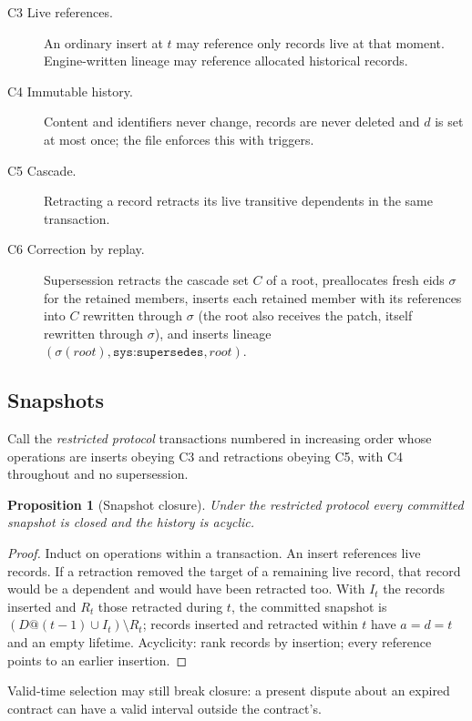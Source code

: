 \documentclass[11pt]{article}
\theoremstyle{plain}
\newtheorem{proposition}[theorem]{Proposition}
\theoremstyle{definition}
\theoremstyle{remark}
\newcommand{\sys}[1]{\texttt{sys:#1}}
\begin{document}
\begin{description}
\item[C3 Live references.] An ordinary insert at $t$ may reference only records live
at that moment. Engine-written lineage may reference allocated historical records.
\item[C4 Immutable history.] Content and identifiers never change, records are never
deleted and $d$ is set at most once; the file enforces this with triggers.
\item[C5 Cascade.] Retracting a record retracts its live transitive dependents in
the same transaction.
\item[C6 Correction by replay.] Supersession retracts the cascade set $C$ of a root,
preallocates fresh eids $\sigma$ for the retained members, inserts each retained
member with its references into $C$ rewritten through $\sigma$ (the root also receives the patch, itself
rewritten through $\sigma$), and inserts lineage $(\sigma(\mathit{root}),\sys{supersedes},\mathit{root})$.
\end{description}

\subsection{Snapshots}
Call the \emph{restricted protocol} transactions numbered in increasing order whose
operations are inserts obeying C3 and retractions obeying C5, with C4 throughout and
no supersession.

\begin{proposition}[Snapshot closure]\label{prop:closure}
Under the restricted protocol every committed snapshot is closed and the history
is acyclic.
\end{proposition}
\begin{proof}
Induct on operations within a transaction. An insert references live records. If a
retraction removed the target of a remaining live record, that record would be a
dependent and would have been retracted too. With $I_t$ the records inserted and
$R_t$ those retracted during $t$, the committed snapshot is
$(D@(t-1)\cup I_t)\setminus R_t$; records inserted and retracted within $t$ have
$a=d=t$ and an empty lifetime. Acyclicity: rank records by insertion; every
reference points to an earlier insertion.
\end{proof}

Valid-time selection may still break closure: a present dispute about an expired
contract can have a valid interval outside the contract's.
\end{document}

